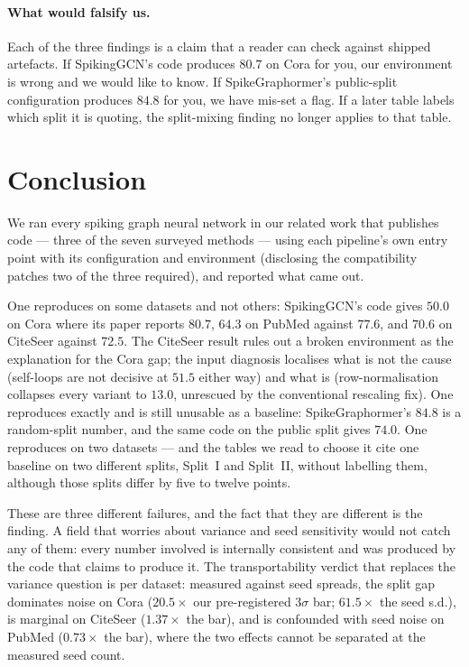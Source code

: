 \documentclass[10pt,twocolumn]{article}
\begin{document}
\paragraph{What would falsify us.} Each of the three findings is a claim that a reader can check
against shipped artefacts. If SpikingGCN's code produces $80.7$ on Cora for you, our environment is
wrong and we would like to know. If SpikeGraphormer's public-split configuration produces $84.8$ for
you, we have mis-set a flag. If a later table labels which split it is quoting, the split-mixing
finding no longer applies to that table.
\section{Conclusion}
\label{sec:conclusion}

We ran every spiking graph neural network in our related work that publishes code --- three of the
seven surveyed methods --- using each pipeline's own entry point with its configuration and
environment (disclosing the compatibility patches two of the three required), and reported what came
out.

One reproduces on some datasets and not others: SpikingGCN's code gives $50.0$ on Cora where its
paper reports $80.7$, $64.3$ on PubMed against $77.6$, and $70.6$ on CiteSeer against $72.5$. The
CiteSeer result rules out a broken environment as the explanation for the Cora gap; the input
diagnosis localises what is not the cause (self-loops are not decisive at $51.5$ either way) and
what is (row-normalisation collapses every variant to $13.0$, unrescued by the conventional
rescaling fix). One reproduces exactly and is still unusable as a baseline:
SpikeGraphormer's $84.8$ is a random-split number, and the same code on the public split gives
$74.0$. One reproduces on two datasets --- and the tables we read to choose it cite one baseline on
two different splits, Split~I and Split~II, without labelling them, although those splits differ by
five to twelve points.

These are three different failures, and the fact that they are different is the finding. A field that
worries about variance and seed sensitivity would not catch any of them: every number involved is
internally consistent and was produced by the code that claims to produce it. The transportability
verdict that replaces the variance question is per dataset: measured against seed spreads, the split
gap dominates noise on Cora ($20.5\times$ our pre-registered $3\sigma$ bar; $61.5\times$ the seed
s.d.), is marginal on CiteSeer ($1.37\times$ the bar), and is confounded with seed noise on PubMed
($0.73\times$ the bar), where the two effects cannot be separated at the measured seed count.
\end{document}
